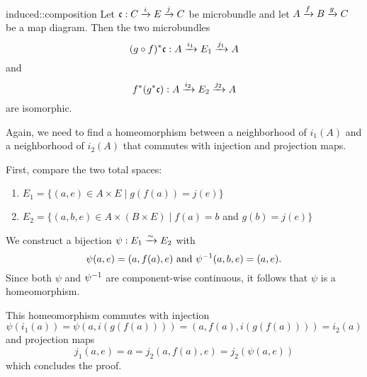 \begin{mylemma}{induced::composition}
    Let $\bundledef{\bc}{C}{E}{i}{j}$ be microbundle and let $A \xto{f} B \xto{g} C$ be a map diagram.
    Then the two microbundles
    \[ \bundledef{\ind{(g \circ f)}\bc}{A}{E_1}{i_1}{j_1} \]
    and
    \[ \bundledef{\ind{f}(\ind{g}\bc)}{A}{E_2}{i_2}{j_2} \]
    are isomorphic.
\end{mylemma}

\begin{myproof}
    Again, we need to find a homeomorphism between a neighborhood of $i_1(A)$ and a neighborhood of $i_2(A)$
    that commutes with injection and projection maps.
    
    First, compare the two total spaces:
    \begin{enumerate}
        \item $E_1 = \{ (a, e) \in A \times E \mid g(f(a)) = j(e)\}$ 
        \item $E_2 = \{ (a, b, e) \in A \times (B \times E) \mid f(a) = b$ and $ g(b) = j(e) \}$
    \end{enumerate}
    We construct a bijection $\psi: E_1 \isomto E_2$ with
    \[ \psi(a, e) = (a, f(a), e) \tand \inv{\psi}(a, b, e) = (a, e).\]
    Since both $\psi$ and $\inv{\psi}$ are component-wise continuous, it follows that $\psi$ is a homeomorphism.

    This homeomorphism commutes with injection
    \[ \psi(i_1(a)) = \psi(a, i(g(f(a)))) = (a, f(a), i(g(f(a)))) = i_2(a) \]
    and projection maps
    \[ j_1(a, e) = a = j_2(a, f(a), e) = j_2(\psi(a, e)) \]
    which concludes the proof.
\end{myproof}